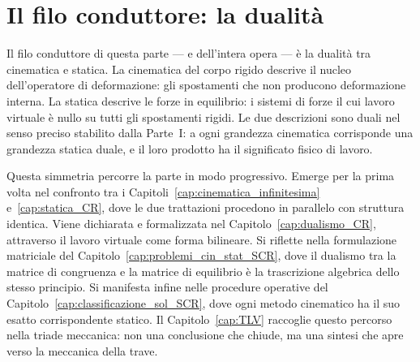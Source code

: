 \section*{Il filo conduttore: la dualità}

Il filo conduttore di questa parte --- e dell'intera opera --- è la dualità tra
cinematica e statica. La cinematica del corpo rigido descrive il nucleo dell'operatore
di deformazione: gli spostamenti che non producono deformazione interna. La statica
descrive le forze in equilibrio: i sistemi di forze il cui lavoro virtuale è nullo su
tutti gli spostamenti rigidi. Le due descrizioni sono duali nel senso preciso
stabilito dalla Parte~I: a ogni grandezza cinematica corrisponde una grandezza
statica duale, e il loro prodotto ha il significato fisico di lavoro.

Questa simmetria percorre la parte in modo progressivo. Emerge per la prima volta nel
confronto tra i Capitoli~\ref{cap:cinematica_infinitesima} e~\ref{cap:statica_CR},
dove le due trattazioni procedono in parallelo con struttura identica. Viene dichiarata
e formalizzata nel Capitolo~\ref{cap:dualismo_CR}, attraverso il lavoro virtuale come
forma bilineare. Si riflette nella formulazione matriciale del
Capitolo~\ref{cap:problemi_cin_stat_SCR}, dove il dualismo tra la matrice di congruenza
e la matrice di equilibrio è la trascrizione algebrica dello stesso principio. Si
manifesta infine nelle procedure operative del Capitolo~\ref{cap:classificazione_sol_SCR},
dove ogni metodo cinematico ha il suo esatto corrispondente statico. Il
Capitolo~\ref{cap:TLV} raccoglie questo percorso nella triade meccanica: non una
conclusione che chiude, ma una sintesi che apre verso la meccanica della trave.



